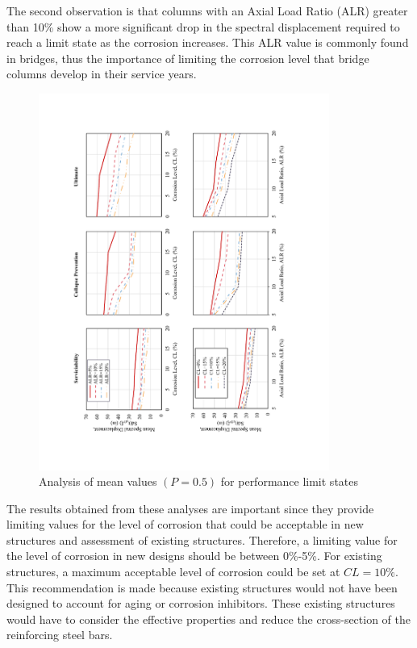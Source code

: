 The second observation is that columns with an Axial Load Ratio (ALR) greater than 10\% show a more significant drop in the spectral displacement required to reach a limit state as the corrosion increases. This ALR value is commonly found in bridges, thus the importance of limiting the corrosion level that bridge columns develop in their service years.

\begin{figure}[htbp]
	\centering
	\includegraphics[width=0.85\textwidth]{VAC Thesis 2.0/Chapter-5/figs/Analysis_of_Mean_SDs.pdf}
	\caption{Analysis of mean values $(P=0.5)$ for performance limit states}
	\label{fig:mean_prob_vs_CL}
\end{figure}

The results obtained from these analyses are important since they provide limiting values for the level of corrosion that could be acceptable in new structures and assessment of existing structures. Therefore, a limiting value for the level of corrosion in new designs should be between 0\%-5\%. For existing structures, a maximum acceptable level of corrosion could be set at $CL=10\%$. This recommendation is made because existing structures would not have been designed to account for aging or corrosion inhibitors. These existing structures would have to consider the effective properties and reduce the cross-section of the reinforcing steel bars. 

